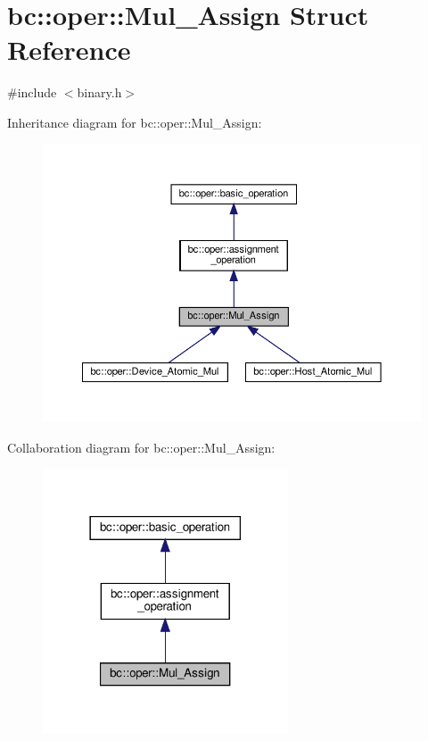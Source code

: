 \hypertarget{structbc_1_1oper_1_1Mul__Assign}{}\section{bc\+:\+:oper\+:\+:Mul\+\_\+\+Assign Struct Reference}
\label{structbc_1_1oper_1_1Mul__Assign}


{\ttfamily \#include $<$binary.\+h$>$}



Inheritance diagram for bc\+:\+:oper\+:\+:Mul\+\_\+\+Assign\+:\nopagebreak
\begin{figure}[H]
\begin{center}
\leavevmode
\includegraphics[width=350pt]{structbc_1_1oper_1_1Mul__Assign__inherit__graph}
\end{center}
\end{figure}


Collaboration diagram for bc\+:\+:oper\+:\+:Mul\+\_\+\+Assign\+:\nopagebreak
\begin{figure}[H]
\begin{center}
\leavevmode
\includegraphics[width=206pt]{structbc_1_1oper_1_1Mul__Assign__coll__graph}
\end{center}
\end{figure}
